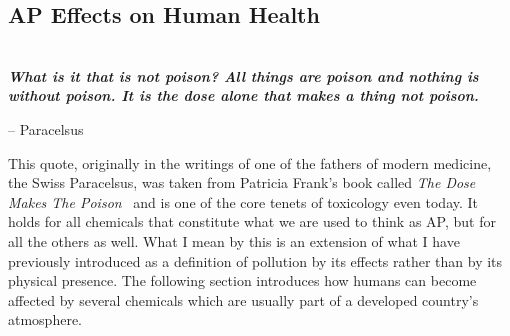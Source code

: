 \subsection{\acrlong{AP} Effects on Human Health}%
\label{sub:ap_effects_on_human_health}

\begin{flushright}
    \begin{minipage}{0.6\textwidth}
        ~\\[.5cm]
        \noindent
        \bfseries
        \textit{
            What is it that is not poison? All things are poison and
            nothing is without poison. It is the dose alone that makes a
            thing not poison.
        }

        \hfill-- Paracelsus
    \end{minipage}
\end{flushright}

This quote, originally in the writings of one of the fathers of modern
medicine, the Swiss Paracelsus, was taken from Patricia Frank's book
called \emph{The Dose Makes The Poison}~\cite{Frank2011} and is one of
the core tenets of toxicology even today. It holds for all chemicals
that constitute what we are used to think as \gls{AP}, but for all the
others as well. What I mean by this is an extension of what I have
previously introduced as a definition of pollution by its effects rather
than by its physical presence. The following section introduces how
humans can become affected by several chemicals which are usually part
of a developed country's atmosphere.




